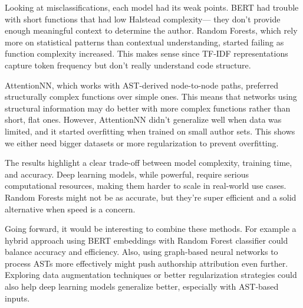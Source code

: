 \documentclass[conference]{IEEEtran}
\begin{document}
Looking at misclassifications, each model had its weak points. BERT had trouble with short functions that had low Halstead complexity— they 
don’t provide enough meaningful context to determine the author. Random Forests, which rely more on statistical patterns than contextual 
understanding, started failing as function complexity increased. This makes sense since TF-IDF representations capture token frequency but 
don’t really understand code structure.

AttentionNN, which works with AST-derived node-to-node paths, preferred structurally complex functions over simple ones. This means that 
networks using structural information may do better with more complex functions rather than short, flat ones. However, AttentionNN didn’t 
generalize well when data was limited, and it started overfitting when trained on small author sets. This shows we either need bigger 
datasets or more regularization to prevent overfitting.

The results highlight a clear trade-off between model complexity, training time, and accuracy. Deep learning models, while powerful, 
require serious computational resources, making them harder to scale in real-world use cases. Random Forests might not be as accurate, 
but they’re super efficient and a solid alternative when speed is a concern.

Going forward, it would be interesting to combine these methods. For example a hybrid approach using BERT embeddings with Random Forest 
classifier could balance accuracy and efficiency. Also, using graph-based neural networks to process ASTs more effectively might push 
authorship attribution even further. Exploring data augmentation techniques or better regularization strategies could also help deep 
learning models generalize better, especially with AST-based inputs.
\end{document}
